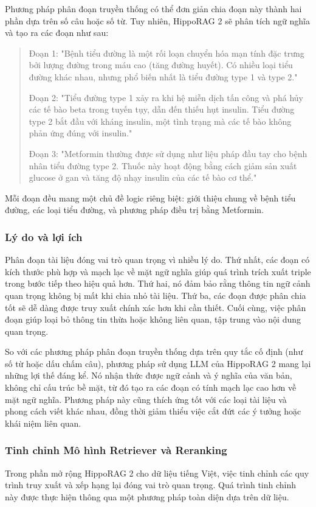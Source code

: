 Phương pháp phân đoạn truyền thống có thể đơn giản chia đoạn này thành hai phần dựa trên số câu hoặc số từ. Tuy nhiên, HippoRAG 2 sẽ phân tích ngữ nghĩa và tạo ra các đoạn như sau:

\begin{quote}
Đoạn 1: "Bệnh tiểu đường là một rối loạn chuyển hóa mạn tính đặc trưng bởi lượng đường trong máu cao (tăng đường huyết). Có nhiều loại tiểu đường khác nhau, nhưng phổ biến nhất là tiểu đường type 1 và type 2."

Đoạn 2: "Tiểu đường type 1 xảy ra khi hệ miễn dịch tấn công và phá hủy các tế bào beta trong tuyến tụy, dẫn đến thiếu hụt insulin. Tiểu đường type 2 bắt đầu với kháng insulin, một tình trạng mà các tế bào không phản ứng đúng với insulin."

Đoạn 3: "Metformin thường được sử dụng như liệu pháp đầu tay cho bệnh nhân tiểu đường type 2. Thuốc này hoạt động bằng cách giảm sản xuất glucose ở gan và tăng độ nhạy insulin của các tế bào cơ thể."
\end{quote}

Mỗi đoạn đều mang một chủ đề logic riêng biệt: giới thiệu chung về bệnh tiểu đường, các loại tiểu đường, và phương pháp điều trị bằng Metformin.

\subsubsection{Lý do và lợi ích}
Phân đoạn tài liệu đóng vai trò quan trọng vì nhiều lý do. Thứ nhất, các đoạn có kích thước phù hợp và mạch lạc về mặt ngữ nghĩa giúp quá trình trích xuất triple trong bước tiếp theo hiệu quả hơn. Thứ hai, nó đảm bảo rằng thông tin ngữ cảnh quan trọng không bị mất khi chia nhỏ tài liệu. Thứ ba, các đoạn được phân chia tốt sẽ dễ dàng được truy xuất chính xác hơn khi cần thiết. Cuối cùng, việc phân đoạn giúp loại bỏ thông tin thừa hoặc không liên quan, tập trung vào nội dung quan trọng.

So với các phương pháp phân đoạn truyền thống dựa trên quy tắc cố định (như số từ hoặc dấu chấm câu), phương pháp sử dụng LLM của HippoRAG 2 mang lại những lợi thế đáng kể. Nó nhận thức được ngữ cảnh và ý nghĩa của văn bản, không chỉ cấu trúc bề mặt, từ đó tạo ra các đoạn có tính mạch lạc cao hơn về mặt ngữ nghĩa. Phương pháp này cũng thích ứng tốt với các loại tài liệu và phong cách viết khác nhau, đồng thời giảm thiểu việc cắt đứt các ý tưởng hoặc khái niệm liên quan.

\subsubsection{Tinh chỉnh Mô hình Retriever và Reranking}
Trong phần mở rộng HippoRAG 2 cho dữ liệu tiếng Việt, việc tinh chỉnh các quy trình truy xuất và xếp hạng lại đóng vai trò quan trọng. Quá trình tinh chỉnh này được thực hiện thông qua một phương pháp toàn diện dựa trên dữ liệu.

